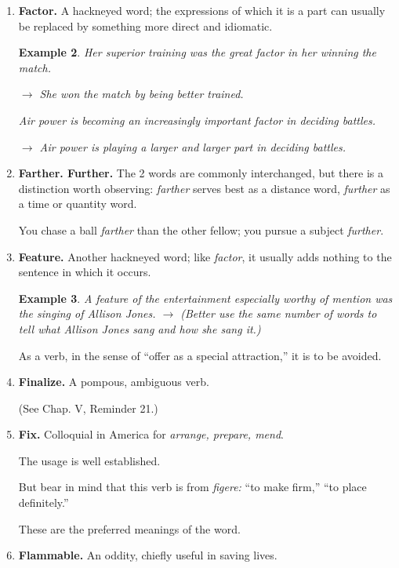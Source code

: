 \documentclass{article}
\newtheorem{example}{Example}
\begin{document}
\begin{enumerate}
\begin{example}
		$\to$ Parents complained bitterly about the fire hazard in the wooden schoolhouse.
		
		He has been appointed warden of the new facility.
		
		$\to$ He has been appointed warden of the new prison.
	\end{example}
	\item {\bf Factor.} A hackneyed word; the expressions of which it is a part can usually be replaced by something more direct and idiomatic.
	\begin{example}
		Her superior training was the great factor in her winning the match.
		
		$\to$ She won the match by being better trained.
		
		Air power is becoming an increasingly important factor in deciding battles.
		
		$\to$ Air power is playing a larger and larger part in deciding battles.
	\end{example}
	\item {\bf Farther. Further.} The 2 words are commonly interchanged, but there is a distinction worth observing: {\it farther} serves best as a distance word, {\it further} as a time or quantity word.
	
	You chase a ball {\it farther} than the other fellow; you pursue a subject {\it further}.
	\item {\bf Feature.} Another hackneyed word; like {\it factor}, it usually adds nothing to the sentence in which it occurs.
	\begin{example}
		A feature of the entertainment especially worthy of mention was the singing of Allison Jones.
		$\to$ (Better use the same number of words to tell what Allison Jones sang and how she sang it.)
	\end{example}
	As a verb, in the sense of ``offer as a special attraction,'' it is to be avoided.
	\item {\bf Finalize.} A pompous, ambiguous verb.
	
	(See Chap. V, Reminder 21.)
	\item {\bf Fix.} Colloquial in America for {\it arrange, prepare, mend}.
	
	The usage is well established.
	
	But bear in mind that this verb is from {\it figere:} ``to make firm,'' ``to place definitely.''
	
	These are the preferred meanings of the word.
	\item {\bf Flammable.} An oddity, chiefly useful in saving lives.
	

\end{enumerate}
\end{document}
